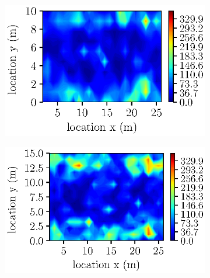 \begin{figure}[htbp!]
        \centering
        \begin{subfigure}[b]{0.475\columnwidth}
            \centering
            \caption{}
            \includegraphics[width=\textwidth]{plots/abswg_width10.eps}
 
            \label{abswg_width10}
        \end{subfigure}
        \begin{subfigure}[b]{0.475\columnwidth}  
            \centering
            \caption{} 
            \includegraphics[width=\textwidth]{plots/abswg_width15.eps}
            

\end{subfigure}
\end{figure}

